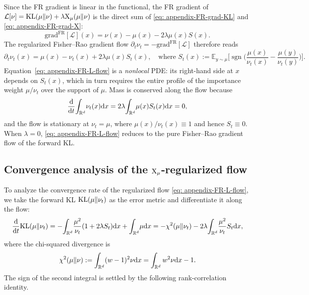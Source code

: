 \documentclass{article}
\begin{document}
Since the FR gradient is linear in the functional, the FR gradient of $\mathcal L[\nu] = \mathrm{KL}(\mu\|\nu) + \lambda \mathrm{X}_\mu(\mu\|\nu)$ is the direct sum of \eqref{eq: appendix-FR-grad-KL} and \eqref{eq: appendix-FR-grad-X}:
\begin{equation*}
    \mathrm{grad}^{\mathrm{FR}}[\mathcal L](x) = \nu(x) - \mu(x) - 2\lambda \mu(x) S(x).
\end{equation*}
The regularized Fisher--Rao gradient flow $\partial_t\nu_t = -\mathrm{grad}^{\mathrm{FR}}[\mathcal L]$ therefore reads
\begin{equation}
    \partial_t\nu_t(x) = \mu(x) - \nu_t(x) + 2\lambda \mu(x) S_t(x), \quad
    \text{where~}
    S_t(x) := \mathbb E_{y\sim\mu}\biggl[\operatorname{sgn}\biggl(\frac{\mu(x)}{\nu_t(x)} - \frac{\mu(y)}{\nu_t(y)}\biggr)\biggr].
    \label{eq: appendix-FR-L-flow}
\end{equation}
Equation~\eqref{eq: appendix-FR-L-flow} is a \emph{nonlocal} PDE: its right-hand side at $x$ depends on $S_t(x)$, which in turn requires the entire profile of the importance weight $\mu/\nu_t$ over the support of $\mu$. Mass is conserved along the flow because
\begin{equation*}
    \frac{\mathrm{d}}{\mathrm{d} t}\!\int_{\mathbb R^d}\!\nu_t(x) \mathrm{d} x = 2\lambda\!\int_{\mathbb R^d}\!\mu(x) S_t(x) \mathrm{d} x = 0,
\end{equation*}
and the flow is stationary at $\nu_t = \mu$, where $\mu(x)/\nu_t(x) \equiv 1$ and hence $S_t\equiv 0$. When $\lambda = 0$, \eqref{eq: appendix-FR-L-flow} reduces to the pure Fisher--Rao gradient flow of the forward KL.

\subsection{Convergence analysis of the $\mathrm{X}_\mu$-regularized flow}
\label{subsec: appendix-FR-convergence}

To analyze the convergence rate of the regularized flow \eqref{eq: appendix-FR-L-flow}, we take the forward KL $\mathrm{KL}(\mu\|\nu_t)$ as the error metric and differentiate it along the flow:
\begin{equation*}
    \frac{\mathrm{d}}{\mathrm{d} t}\mathrm{KL}(\mu\|\nu_t) = -\!\int_{\mathbb R^d}\!\frac{\mu^2}{\nu_t}(1 + 2\lambda S_t) \mathrm{d} x + \int_{\mathbb R^d}\!\mu \mathrm{d} x = -\chi^2(\mu\|\nu_t) - 2\lambda\!\int_{\mathbb R^d}\!\frac{\mu^2}{\nu_t} S_t \mathrm{d} x,
\end{equation*}
where the chi-squared divergence is
\begin{equation*}
    \chi^2(\mu\|\nu) := \int_{\mathbb R^d}(w-1)^2\nu\mathrm{d} x = \int_{\mathbb R^d} w^2\nu\mathrm{d} x - 1.
\end{equation*}
The sign of the second integral is settled by the following rank-correlation identity.
\end{document}
